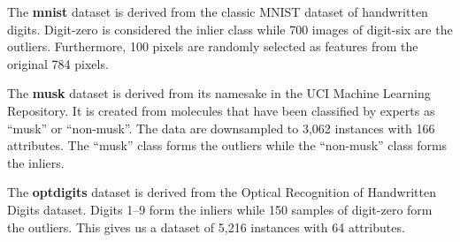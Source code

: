 The \textbf{mnist} dataset is derived from the classic MNIST dataset of handwritten digits.
Digit-zero is considered the inlier class while 700 images of digit-six are the outliers.
Furthermore, 100 pixels are randomly selected as features from the original 784 pixels.

The \textbf{musk} dataset is derived from its namesake in the UCI Machine Learning Repository.
It is created from molecules that have been classified by experts as ``musk'' or ``non-musk''.
The data are downsampled to 3,062 instances with 166 attributes.
The ``musk'' class forms the outliers while the ``non-musk'' class forms the inliers.

The \textbf{optdigits} dataset is derived from the Optical Recognition of Handwritten Digits dataset.
Digits 1--9 form the inliers while 150 samples of digit-zero form the outliers.
This gives us a dataset of 5,216 instances with 64 attributes.

%
%
%
%
%
%
%
%
%
%
